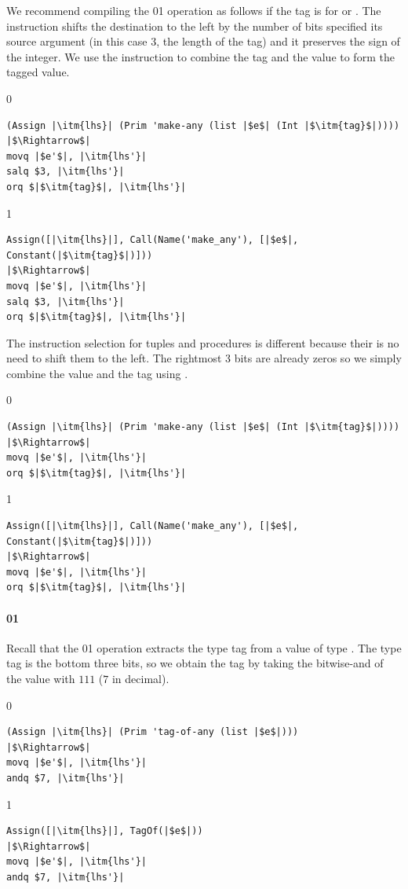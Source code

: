 \documentclass[7x10]{TimesAPriori_MIT}%
\def\racketEd{0}
\def\pythonEd{1}
\def\edition{0}
\newcommand{\racket}[1]{{\if\edition\racketEd{#1}\fi}}
\newcommand{\python}[1]{{\if\edition\pythonEd #1\fi}}
\numberwithin{theorem}{chapter}
\numberwithin{definition}{chapter}
\numberwithin{equation}{chapter}
\begin{document}
We recommend compiling the
\racket{}\python{} operation as follows
if the tag is for \INTTY{} or \BOOLTY{}.  The  instruction
shifts the destination to the left by the number of bits specified its
source argument (in this case $3$, the length of the tag) and it
preserves the sign of the integer. We use the  instruction to
combine the tag and the value to form the tagged value.  \\
%
{\if\edition\racketEd
\begin{lstlisting}
(Assign |\itm{lhs}| (Prim 'make-any (list |$e$| (Int |$\itm{tag}$|))))
|$\Rightarrow$|
movq |$e'$|, |\itm{lhs'}|
salq $3, |\itm{lhs'}|
orq $|$\itm{tag}$|, |\itm{lhs'}|
\end{lstlisting}
\fi}
%
{\if\edition\pythonEd
\begin{lstlisting}
Assign([|\itm{lhs}|], Call(Name('make_any'), [|$e$|, Constant(|$\itm{tag}$|)]))
|$\Rightarrow$|
movq |$e'$|, |\itm{lhs'}|
salq $3, |\itm{lhs'}|
orq $|$\itm{tag}$|, |\itm{lhs'}|
\end{lstlisting}
\fi}
%
The instruction selection for tuples and procedures is different
because their is no need to shift them to the left. The rightmost 3
bits are already zeros so we simply combine the value and the tag
using .  \\
%
{\if\edition\racketEd
\begin{center}
\begin{minipage}{\textwidth}
\begin{lstlisting}
(Assign |\itm{lhs}| (Prim 'make-any (list |$e$| (Int |$\itm{tag}$|))))
|$\Rightarrow$|
movq |$e'$|, |\itm{lhs'}|
orq $|$\itm{tag}$|, |\itm{lhs'}|
\end{lstlisting}
\end{minipage}
\end{center}
\fi}
%
{\if\edition\pythonEd
\begin{lstlisting}
Assign([|\itm{lhs}|], Call(Name('make_any'), [|$e$|, Constant(|$\itm{tag}$|)]))
|$\Rightarrow$|
movq |$e'$|, |\itm{lhs'}|
orq $|$\itm{tag}$|, |\itm{lhs'}|
\end{lstlisting}
\fi}

\paragraph{\racket{}\python{}}

Recall that the \racket{}\python{}
operation extracts the type tag from a value of type \ANYTY{}. The
type tag is the bottom three bits, so we obtain the tag by taking the
bitwise-and of the value with $111$ ($7$ in decimal).
%
{\if\edition\racketEd
\begin{lstlisting}
(Assign |\itm{lhs}| (Prim 'tag-of-any (list |$e$|)))
|$\Rightarrow$|
movq |$e'$|, |\itm{lhs'}|
andq $7, |\itm{lhs'}|
\end{lstlisting}
\fi}
%
{\if\edition\pythonEd
\begin{lstlisting}
Assign([|\itm{lhs}|], TagOf(|$e$|))
|$\Rightarrow$|
movq |$e'$|, |\itm{lhs'}|
andq $7, |\itm{lhs'}|
\end{lstlisting}
\fi}
\end{document}
